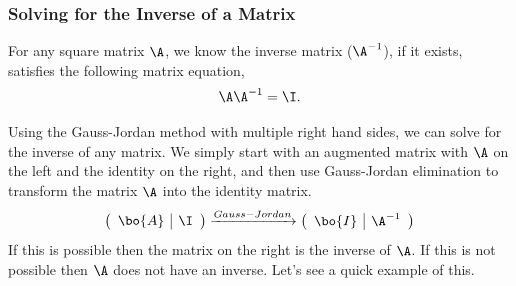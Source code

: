 \documentclass[
]{article}
\theoremstyle{definition}
\theoremstyle{definition}
\theoremstyle{definition}
\theoremstyle{definition}
\theoremstyle{remark}
\begin{document}
\hypertarget{solving-for-the-inverse-of-a-matrix}{%
\subsubsection{Solving for the Inverse of a Matrix}\label{solving-for-the-inverse-of-a-matrix}}

For any square matrix \(\A\), we know the inverse matrix (\(\A^{-1}\)), if it exists, satisfies the following matrix equation,
\[\A\A^{-1} = \I.\]

Using the Gauss-Jordan method with multiple right hand sides, we can solve for the inverse of any matrix. We simply start with an augmented matrix with \(\A\) on the left and the identity on the right, and then use Gauss-Jordan elimination to transform the matrix \(\A\) into the identity matrix.
\[\left(\begin{array}{r|r}
 \bo{A} & \I\end{array}\right)\xrightarrow{Gauss-Jordan}\left(\begin{array}{r|r} \bo{I} & \A^{-1}\end{array}\right)\]
If this is possible then the matrix on the right is the inverse of \(\A\). If this is not possible then \(\A\) does not have an inverse. Let's see a quick example of this.
\end{document}
